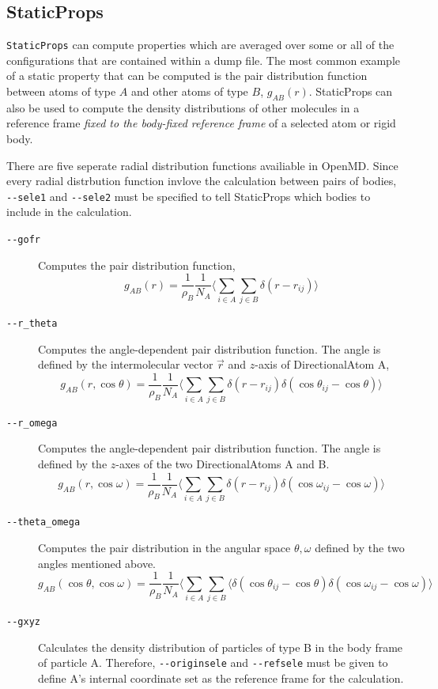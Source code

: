 \documentclass[]{book}
\begin{document}
\subsection{\label{section:StaticProps}StaticProps}

{\tt StaticProps} can compute properties which are averaged over some
or all of the configurations that are contained within a dump file.
The most common example of a static property that can be computed is
the pair distribution function between atoms of type $A$ and other
atoms of type $B$, $g_{AB}(r)$.  StaticProps can also be used to
compute the density distributions of other molecules in a reference
frame {\it fixed to the body-fixed reference frame} of a selected atom
or rigid body.

There are five seperate radial distribution functions availiable in
{\sc OpenMD}. Since every radial distrbution function invlove the calculation
between pairs of bodies, {\tt -{}-sele1} and {\tt -{}-sele2} must be specified to tell
StaticProps which bodies to include in the calculation.

\begin{description}
\item[{\tt -{}-gofr}] Computes the pair distribution function,
\begin{equation*}
g_{AB}(r) = \frac{1}{\rho_B}\frac{1}{N_A} \langle \sum_{i \in A}
\sum_{j \in B} \delta(r - r_{ij}) \rangle
\end{equation*}
\item[{\tt -{}-r\_theta}] Computes the angle-dependent pair distribution
function. The angle is defined by the intermolecular vector $\vec{r}$ and
$z$-axis of DirectionalAtom A,
\begin{equation*}
g_{AB}(r, \cos \theta) = \frac{1}{\rho_B}\frac{1}{N_A} \langle \sum_{i \in A}
\sum_{j \in B} \delta(r - r_{ij}) \delta(\cos \theta_{ij} - \cos \theta)\rangle
\end{equation*}
\item[{\tt -{}-r\_omega}] Computes the angle-dependent pair distribution
function. The angle is defined by the $z$-axes of the two
DirectionalAtoms A and B. 
\begin{equation*}
g_{AB}(r, \cos \omega) = \frac{1}{\rho_B}\frac{1}{N_A} \langle \sum_{i \in A}
\sum_{j \in B} \delta(r - r_{ij}) \delta(\cos \omega_{ij} - \cos \omega)\rangle
\end{equation*}
\item[{\tt -{}-theta\_omega}] Computes the pair distribution in the angular
space $\theta, \omega$ defined by the two angles mentioned above.
\begin{equation*}
g_{AB}(\cos\theta, \cos \omega) = \frac{1}{\rho_B}\frac{1}{N_A} \langle \sum_{i \in A}
\sum_{j \in B} \langle \delta(\cos \theta_{ij} - \cos \theta)
\delta(\cos \omega_{ij} - \cos \omega)\rangle
\end{equation*}
\item[{\tt -{}-gxyz}] Calculates the density distribution of particles of type
B in the body frame of particle A. Therefore, {\tt -{}-originsele} and
{\tt -{}-refsele} must be given to define A's internal coordinate set as
the reference frame for the calculation.
\end{description}
\end{document}
